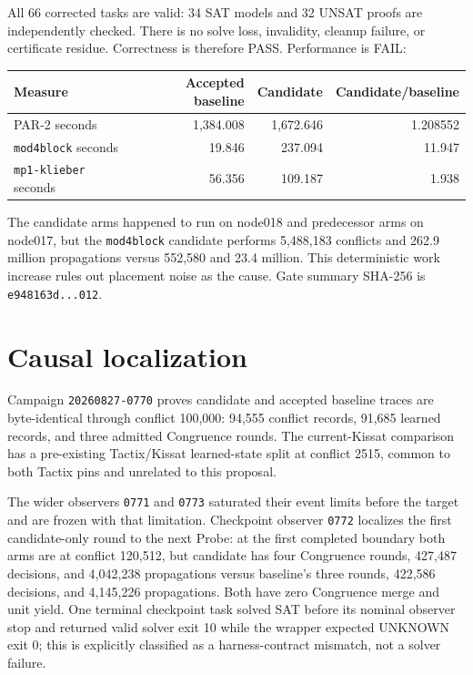\documentclass[11pt]{article}
\newcommand{\code}[1]{\texttt{#1}}
\newcommand{\pass}{\textcolor{green!50!black}{PASS}}
\newcommand{\fail}{\textcolor{red!70!black}{FAIL}}
\begin{document}
All 66 corrected tasks are valid: 34 SAT models and 32 UNSAT proofs are
independently checked.  There is no solve loss, invalidity, cleanup failure,
or certificate residue.  Correctness is therefore \pass.  Performance is
\fail:

\begin{center}
\begin{tabular}{@{}lrrr@{}}
\toprule
Measure & Accepted baseline & Candidate & Candidate/baseline \\
\midrule
PAR-2 seconds & 1,384.008 & 1,672.646 & 1.208552 \\
\code{mod4block} seconds & 19.846 & 237.094 & 11.947 \\
\code{mp1-klieber} seconds & 56.356 & 109.187 & 1.938 \\
\bottomrule
\end{tabular}
\end{center}

The candidate arms happened to run on node018 and predecessor arms on
node017, but the \code{mod4block} candidate performs 5,488,183 conflicts and
262.9 million propagations versus 552,580 and 23.4 million.  This deterministic
work increase rules out placement noise as the cause.  Gate summary SHA-256 is
\code{e948163d...012}.

\section{Causal localization}

Campaign \code{20260827-0770} proves candidate and accepted baseline traces
are byte-identical through conflict 100,000: 94,555 conflict records, 91,685
learned records, and three admitted Congruence rounds.  The current-Kissat
comparison has a pre-existing Tactix/Kissat learned-state split at conflict
2515, common to both Tactix pins and unrelated to this proposal.

The wider observers \code{0771} and \code{0773} saturated their event limits
before the target and are frozen with that limitation.  Checkpoint observer
\code{0772} localizes the first candidate-only round to the next Probe: at the
first completed boundary both arms are at conflict 120,512, but candidate has
four Congruence rounds, 427,487 decisions, and 4,042,238 propagations versus
baseline's three rounds, 422,586 decisions, and 4,145,226 propagations.  Both
have zero Congruence merge and unit yield.  One terminal checkpoint task solved
SAT before its nominal observer stop and returned valid solver exit 10 while
the wrapper expected UNKNOWN exit 0; this is explicitly classified as a
harness-contract mismatch, not a solver failure.
\end{document}
